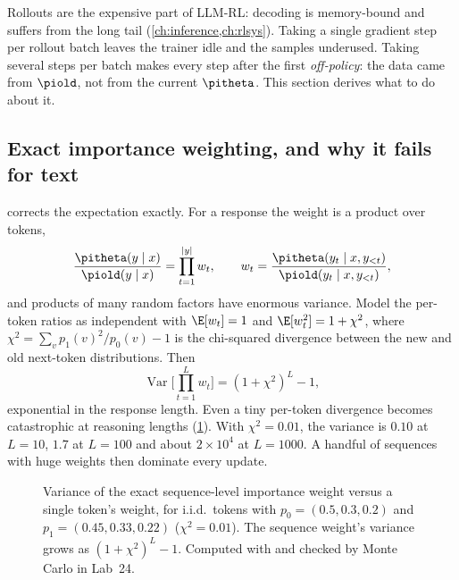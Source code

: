 Rollouts are the expensive part of LLM-RL: decoding is memory-bound and suffers from the long
tail (\cref{ch:inference,ch:rlsys}). Taking a single gradient step per rollout batch leaves
the trainer idle and the samples underused. Taking several steps per batch makes every step
after the first \emph{off-policy}: the data came from $\piold$, not from the current
$\pitheta$. This section derives what to do about it.

\subsection{Exact importance weighting, and why it fails for text}\label{sec:pg:is}

 corrects the expectation exactly. For a response the weight is a product over
tokens,
\begin{equation}
\frac{\pitheta(y\mid x)}{\piold(y\mid x)}=\prod_{t=1}^{|y|}w_t,\qquad
w_t=\frac{\pitheta(y_t\mid x,y_{<t})}{\piold(y_t\mid x,y_{<t})},
\end{equation}
and products of many random factors have enormous variance. Model the per-token ratios as
independent with $\E[w_t]=1$ and $\E[w_t^2]=1+\chi^2$, where $\chi^2=\sum_v p_1(v)^2/p_0(v)-1$ is
the chi-squared divergence between the new and old next-token distributions. Then
\begin{equation}
\operatorname{Var}\Big[\prod_{t=1}^{L}w_t\Big]=(1+\chi^2)^L-1 ,
\end{equation}
exponential in the response length. Even a tiny per-token divergence becomes catastrophic
at reasoning lengths (\cref{fig:pg:isvar}). With $\chi^2=0.01$, the variance is $0.10$ at
$L=10$, $1.7$ at $L=100$ and about $2\times10^4$ at $L=1000$. A handful of sequences with huge
weights then dominate every update.

\begin{figure}[t]
\centering
{}
\caption{Variance of the exact sequence-level importance weight versus a single token's
weight, for i.i.d.\ tokens with $p_0=(0.5,0.3,0.2)$ and $p_1=(0.45,0.33,0.22)$
($\chi^2=0.01$). The sequence weight's variance grows as $(1+\chi^2)^L-1$. Computed with
 and checked by Monte Carlo in Lab~24.}
\label{fig:pg:isvar}
\end{figure}

